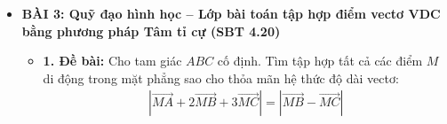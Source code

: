 \documentclass[12pt,a4paper]{article}
\begin{document}
\begin{itemize}
\begin{itemize}
\begin{itemize}
            \item \textit{Bước 3: Giải phương trình tích vô hướng}\\
            Áp dụng điều kiện vuông góc $\vec{AM} \cdot \vec{NP} = 0$:
            \begin{align*}
                \left(\frac{1}{3}\vec{AB} + \frac{2}{3}\vec{AC}\right) \cdot \left(k\vec{AB} - \frac{1}{3}\vec{AC}\right) &= 0 \\
                \Longleftrightarrow \frac{k}{3}AB^2 - \frac{1}{9}(\vec{AB}\cdot\vec{AC}) + \frac{2k}{3}(\vec{AC}\cdot\vec{AB}) - \frac{2}{9}AC^2 &= 0 \\
                \Longleftrightarrow \frac{k}{3}(1) - \frac{1}{9}\left(\frac{1}{2}\right) + \frac{2k}{3}\left(\frac{1}{2}\right) - \frac{2}{9}(1) &= 0 \\
                \Longleftrightarrow \frac{k}{3} - \frac{1}{18} + \frac{k}{3} - \frac{2}{9} &= 0 \\
                \Longleftrightarrow \frac{2k}{3} - \frac{5}{18} &= 0 \\
                \Longleftrightarrow \frac{2k}{3} = \frac{5}{18} \quad \Longrightarrow \quad k &= \frac{5}{12}
            \end{align*}
        \end{itemize}
        \textbf{Kết luận:} Tỉ số cần tìm là $\frac{AP}{AB} = \frac{5}{12}$.
    \end{itemize}

    \vspace{4mm}

    \item \textbf{BÀI 3: Quỹ đạo hình học -- Lớp bài toán tập hợp điểm vectơ VDC bằng phương pháp Tâm tỉ cự (SBT 4.20)}
    \begin{itemize}
        \item \textbf{1. Đề bài:}
        Cho tam giác $ABC$ cố định. Tìm tập hợp tất cả các điểm $M$ di động trong mặt phẳng sao cho thỏa mãn hệ thức độ dài vectơ:
        \begin{align*}
            \left|\vec{MA} + 2\vec{MB} + 3\vec{MC}\right| = \left|\vec{MB} - \vec{MC}\right|
        \end{align*}


\end{itemize}
\end{itemize}
\end{document}

